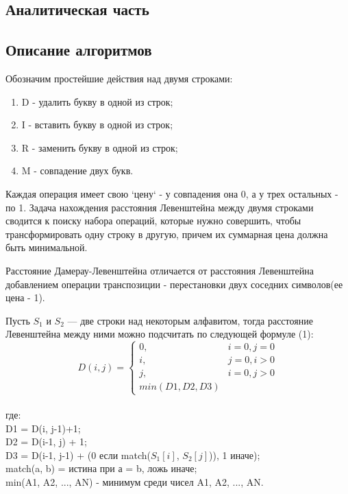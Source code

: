 \documentclass[a4paper, 14pt]{article}
\begin{document}
        \label{sec:intro}

    \begin{center}
    	\newpage
        \section{Аналитическая часть}
		\parindent=1cm
        \subsection{Описание алгоритмов}
        \begin{flushleft}
        Обозначим простейшие действия над двумя строками:
        \begin{enumerate}
        	\item D - удалить букву в одной из строк;
        	\item I - вставить букву в одной из строк;
        	\item R - заменить букву в одной из строк;
        	\item M - совпадение двух букв.
        \end{enumerate}
        \parindent=1cm
        Каждая операция имеет свою `цену` - у совпадения она 0, а у трех остальных - по 1.
        Задача нахождения расстояния Левенштейна между двумя строками сводится к поиску набора операций, которые нужно совершить, чтобы трансформировать одну строку в другую, причем их суммарная цена должна быть минимальной.
        
        Расстояние Дамерау-Левенштейна отличается от расстояния Левенштейна добавлением операции транспозиции - перестановки двух соседних символов(ее цена - 1).	
        
        Пусть $S_{1}$ и $S_{2}$ — две строки над некоторым алфавитом, тогда расстояние Левенштейна между ними можно подсчитать по следующей формуле (1):
        \begin{equation}
			D(i,j) = \left\{ \begin{array}{ll}
 			0, & \textrm{$i = 0, j = 0$}\\
 			i, & \textrm{$j = 0, i > 0$}\\
 			j, & \textrm{$i = 0, j > 0$}\\
			min(D1,D2,D3)
  			\end{array} \right.
		\end{equation}
		\\где:\\ 
		D1 = D(i, j-1)+1;\\
		D2 = D(i-1, j) + 1;\\
		D3 = D(i-1, j-1) + (0 если match($S_{1}[i]$, $S_{2}[j]$)), 1 иначе);\\
		match(a, b) = истина при а = b, ложь иначе;\\
		min(A1, A2, ..., AN) - минимум среди чисел A1, A2, ..., AN.\\
		

\end{flushleft}
\end{center}
\end{document}
